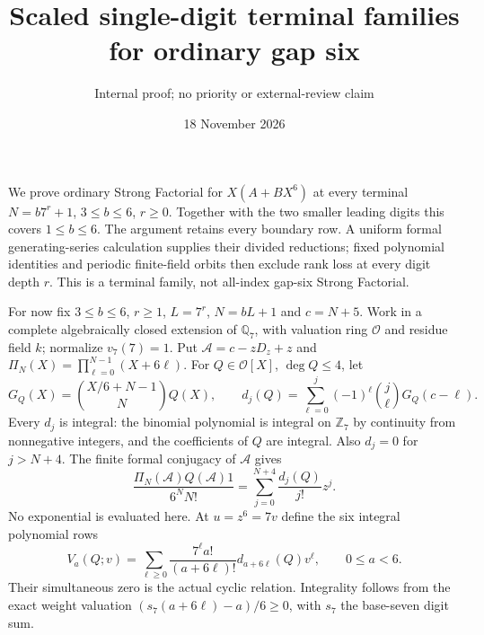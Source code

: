 \documentclass[11pt]{article}
\title{Scaled single-digit terminal families for ordinary gap six}
\author{Internal proof; no priority or external-review claim}
\date{18 November 2026}
\begin{document}
\setlength{\emergencystretch}{1em}\maketitle
We prove ordinary Strong Factorial for $X(A+BX^6)$ at every terminal
$N=b7^r+1$, $3\le b\le6$, $r\ge0$.
Together with the two smaller leading digits this covers
$1\le b\le6$.  The argument retains every boundary row.
A uniform formal generating-series calculation supplies their divided
reductions; fixed polynomial identities and periodic finite-field
orbits then exclude rank loss at every digit depth $r$.
This is a terminal family, not all-index gap-six Strong Factorial.

For now fix $3\le b\le6$, $r\ge1$, $L=7^r$, $N=bL+1$ and $c=N+5$.
Work in a complete algebraically closed extension of $\mathbb Q_7$,
with valuation ring $\mathcal O$ and residue field $k$; normalize
$v_7(7)=1$.  Put $\mathcal A=c-zD_z+z$ and
$\Pi_N(X)=\prod_{\ell=0}^{N-1}(X+6\ell)$.
For $Q\in\mathcal O[X]$, $\deg Q\le4$, let
\[
 G_Q(X)=\binom{X/6+N-1}{N}Q(X),\qquad
 d_j(Q)=\sum_{\ell=0}^j(-1)^\ell\binom j\ell G_Q(c-\ell).
\]
Every $d_j$ is integral: the binomial polynomial is integral on
$\mathbb Z_7$ by continuity from nonnegative integers, and the
coefficients of $Q$ are integral.
Also $d_j=0$ for $j>N+4$.
The finite formal conjugacy of $\mathcal A$ gives
\[
 \frac{\Pi_N(\mathcal A)Q(\mathcal A)1}{6^NN!}
   =\sum_{j=0}^{N+4}\frac{d_j(Q)}{j!}z^j .
\]
No exponential is evaluated here.  At $u=z^6=7v$ define the six
integral polynomial rows
\[
 V_a(Q;v)=\sum_{\ell\ge0}
   \frac{7^\ell a!}{(a+6\ell)!}d_{a+6\ell}(Q)v^\ell,
                \qquad0\le a<6.                         \tag{1}
\]
Their simultaneous zero is the actual cyclic relation.
Integrality follows from the exact weight valuation
$(s_7(a+6\ell)-a)/6\ge0$, with $s_7$ the base-seven digit sum.
\end{document}
